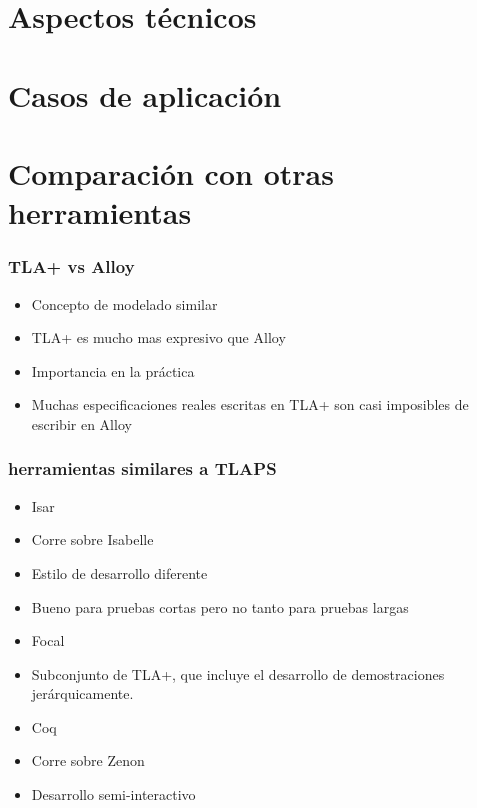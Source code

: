 \documentclass[12pt]{beamer}
\newenvironment{stepitemize}{\begin{itemize}[<+->]}{\end{itemize} }
\begin{document}
\section{Aspectos técnicos}
\begin{frame}
\end{frame}


\section{Casos de aplicación}

\begin{frame}
\end{frame}

\section{Comparación con otras herramientas}
\begin{frame}


\frametitle{TLA+ vs Alloy}
    \begin{itemize}
      \item Concepto de modelado similar
      \item TLA+ es mucho mas expresivo que Alloy
      \item Importancia en la práctica
      \item Muchas especificaciones reales escritas en TLA+ son casi imposibles de escribir en Alloy
    \end{itemize}

\end{frame}

\begin{frame}

  \frametitle{herramientas similares a TLAPS}
  \begin{stepitemize}
	  \item Isar
	    \item Corre sobre Isabelle
	    \item Estilo de desarrollo diferente
	    \item Bueno para pruebas cortas pero no tanto para pruebas largas
	    \item Focal
	    \item Subconjunto de TLA+, que incluye el desarrollo de demostraciones jerárquicamente.
	    \item Coq
	    \item Corre sobre Zenon
	    \item Desarrollo semi-interactivo
	    

\end{stepitemize}


\end{frame}
\end{document}
